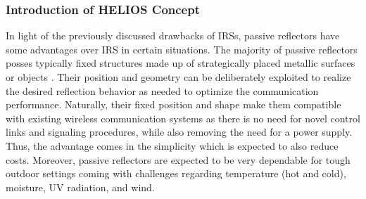 \subsubsection{Introduction of HELIOS Concept} \label{Introduction of HELIOS Concept}
In light of the previously discussed drawbacks of IRSs, passive reflectors have some advantages over \ac{IRS} in certain situations. The majority of passive reflectors posses typically fixed structures made up of strategically placed metallic surfaces or objects \cite{Anjinappa, Passiverefl}. Their position and geometry can be deliberately exploited to realize the desired reflection behavior as needed to optimize the communication performance. Naturally, their fixed position and shape make them compatible with existing wireless communication systems as there is no need for novel control links and signaling procedures, while also removing the need for a power supply. Thus, the advantage comes in the simplicity which is expected to also reduce costs. Moreover, passive reflectors are expected to be very dependable for tough outdoor settings coming with challenges regarding temperature (hot and cold), moisture, UV radiation, and wind.

